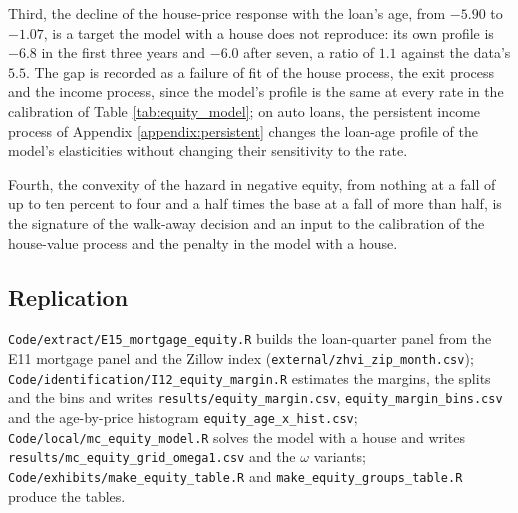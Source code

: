 Third, the decline of the house-price response with the loan's age, from $-5.90$ to $-1.07$, is a target the model with a house does not reproduce: its own profile is $-6.8$ in the first three years and $-6.0$ after seven, a ratio of $1.1$ against the data's $5.5$. The gap is recorded as a failure of fit of the house process, the exit process and the income process, since the model's profile is the same at every rate in the calibration of Table \ref{tab:equity_model}; on auto loans, the persistent income process of Appendix \ref{appendix:persistent} changes the loan-age profile of the model's elasticities without changing their sensitivity to the rate.

Fourth, the convexity of the hazard in negative equity, from nothing at a fall of up to ten percent to four and a half times the base at a fall of more than half, is the signature of the walk-away decision and an input to the calibration of the house-value process and the penalty in the model with a house.

\subsection{Replication}

\texttt{Code/extract/E15\_mortgage\_equity.R} builds the loan-quarter panel from the E11 mortgage panel and the Zillow index (\texttt{external/zhvi\_zip\_month.csv}); \texttt{Code/identification/I12\_equity\_margin.R} estimates the margins, the splits and the bins and writes \texttt{results/equity\_margin.csv}, \texttt{equity\_margin\_bins.csv} and the age-by-price histogram \texttt{equity\_age\_x\_hist.csv}; \texttt{Code/local/mc\_equity\_model.R} solves the model with a house and writes \texttt{results/mc\_equity\_grid\_omega1.csv} and the $\omega$ variants; \texttt{Code/exhibits/make\_equity\_table.R} and \texttt{make\_equity\_groups\_table.R} produce the tables.
